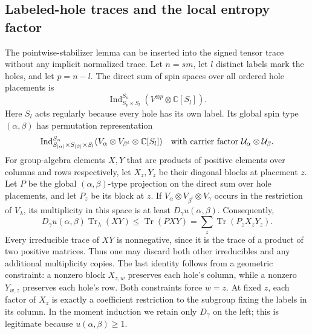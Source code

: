 \subsection{Labeled-hole traces and the local entropy factor}\label{s:labeled-hole-traces}

The pointwise-stabilizer lemma can be inserted into the signed tensor
trace without any implicit normalized trace. Let $n=sm$, let $l$
distinct labels mark the holes, and let $p=n-l$. The direct sum of
spin spaces over all ordered hole placements is
\[
 \operatorname{Ind}_{S_p\times S_l}^{S_n}
       (V^{\otimes p}\otimes\mathbb C[S_l]).
\]
Here $S_l$ acts regularly because every hole has its own label. Its
global spin type $(\alpha,\beta)$ has permutation representation
\[
 \operatorname{Ind}_{S_{|\alpha|}\times S_{|\beta|}\times S_l}^{S_n}
       (V_\alpha\otimes V_{\beta^t}\otimes\mathbb C[S_l])
 \quad\hbox{with carrier factor }\mathcal U_\alpha\otimes\mathcal U_\beta.
\]
For group-algebra elements $X,Y$ that are products of positive elements
over columns and rows respectively, let $X_z,Y_z$ be their diagonal blocks at placement
$z$. Let $P$ be the global $(\alpha,\beta)$-type projection on the
direct sum over hole placements, and let $P_z$ be its block at $z$.
If $V_\alpha\otimes V_{\beta^t}\otimes V_\gamma$ occurs in the
restriction of $V_\lambda$, its multiplicity in this space is at
least $D_\gamma u(\alpha,\beta)$. Consequently,
\begin{equation}
 D_\gamma u(\alpha,\beta)\operatorname{Tr}_\lambda(XY)
 \le\operatorname{Tr}(PXY)
 =\sum_z\operatorname{Tr}(P_zX_zY_z).
 \label{eq:labeled-hole-trace}
\end{equation}
Every irreducible trace of $XY$ is nonnegative, since it is the trace
of a product of two positive matrices. Thus one may discard both
other irreducibles and any additional multiplicity copies. The last
identity follows from a geometric constraint: a nonzero block
$X_{z,w}$ preserves each hole's column, while a nonzero $Y_{w,z}$
preserves each hole's row. Both constraints force $w=z$. At fixed
$z$, each factor of $X_z$ is exactly a coefficient restriction to
the subgroup fixing the labels in its column. In the moment induction we retain only $D_\gamma$ on the left; this is legitimate because
$u(\alpha,\beta)\ge1$.

